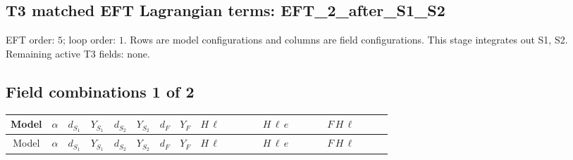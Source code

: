 \documentclass[8pt]{article}
\begin{document}
\begin{landscape}
\section*{T3 matched EFT Lagrangian terms: EFT\_2\_after\_S1\_S2}
EFT order: $5$; loop order: $1$. 
Rows are model configurations and columns are field configurations. This stage integrates out S1, S2. Remaining active T3 fields: none.
\tiny
\subsection*{Field combinations 1 of 2}
\begin{longtable}{@{}cccccccc >{\raggedright\arraybackslash}p{0.21\linewidth} >{\raggedright\arraybackslash}p{0.21\linewidth} >{\raggedright\arraybackslash}p{0.21\linewidth}@{}}
\toprule
Model & $\alpha$ & $d_{S_1}$ & $Y_{S_1}$ & $d_{S_2}$ & $Y_{S_2}$ & $d_F$ & $Y_F$ & $H\,\ell$ & $H\,\ell\,e$ & $F\,H\,\ell$ \\
\midrule
\endfirsthead
\toprule
Model & $\alpha$ & $d_{S_1}$ & $Y_{S_1}$ & $d_{S_2}$ & $Y_{S_2}$ & $d_F$ & $Y_F$ & $H\,\ell$ & $H\,\ell\,e$ & $F\,H\,\ell$ \\
\midrule
\endhead

\end{longtable}
\end{landscape}
\end{document}
